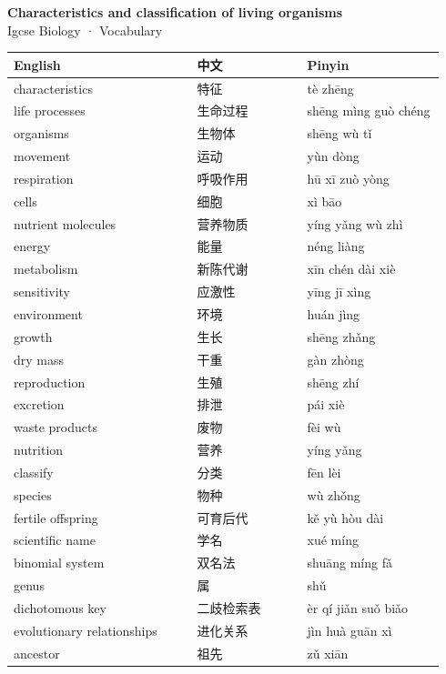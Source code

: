 \documentclass[11pt]{article}
\begin{document}
\begin{center}
  {\LARGE\bfseries Characteristics and classification of living organisms}\\[0.35em]
  {\large Igcse Biology · Vocabulary}
\end{center}
\vspace{0.6em}

\begin{longtable}{@{}p{0.40\linewidth}p{0.24\linewidth}p{0.30\linewidth}@{}}
\toprule
\textbf{English} & \textbf{中文} & \textbf{Pinyin} \\
\midrule
\endhead
\bottomrule
\endlastfoot
characteristics & 特征 & tè zhēng \\
life processes & 生命过程 & shēng mìng guò chéng \\
organisms & 生物体 & shēng wù tǐ \\
movement & 运动 & yùn dòng \\
respiration & 呼吸作用 & hū xī zuò yòng \\
cells & 细胞 & xì bāo \\
nutrient molecules & 营养物质 & yíng yǎng wù zhì \\
energy & 能量 & néng liàng \\
metabolism & 新陈代谢 & xīn chén dài xiè \\
sensitivity & 应激性 & yīng jī xìng \\
environment & 环境 & huán jìng \\
growth & 生长 & shēng zhǎng \\
dry mass & 干重 & gàn zhòng \\
reproduction & 生殖 & shēng zhí \\
excretion & 排泄 & pái xiè \\
waste products & 废物 & fèi wù \\
nutrition & 营养 & yíng yǎng \\
classify & 分类 & fēn lèi \\
species & 物种 & wù zhǒng \\
fertile offspring & 可育后代 & kě yù hòu dài \\
scientific name & 学名 & xué míng \\
binomial system & 双名法 & shuāng míng fǎ \\
genus & 属 & shǔ \\
dichotomous key & 二歧检索表 & èr qí jiǎn suǒ biǎo \\
evolutionary relationships & 进化关系 & jìn huà guān xì \\
ancestor & 祖先 & zǔ xiān \\

\end{longtable}
\end{document}

